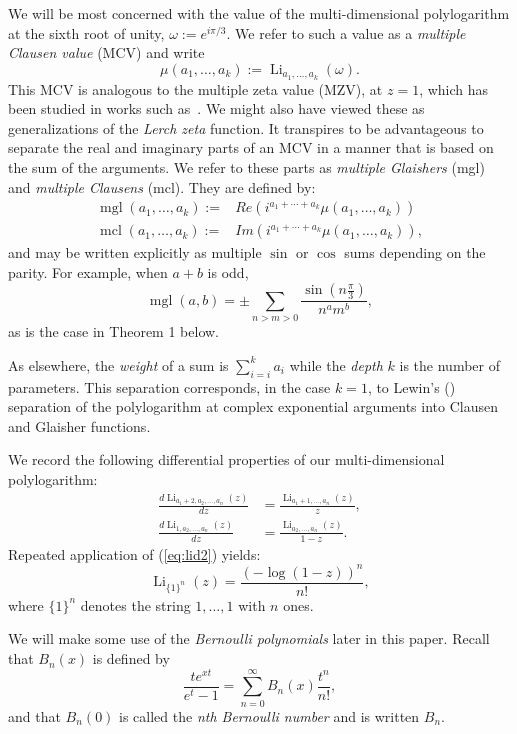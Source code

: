 \documentclass[a4paper,a4paper]{article}
\newcommand{\mcl}{\operatorname{mcl}}
\newcommand{\mgl}{\operatorname{mgl}}
\newcommand{\li}{\operatorname{Li}}
\begin{document}
We will be most concerned with the value of the
multi-dimensional polylogarithm at the sixth root of unity,
 $ \omega := e^{i\pi/3} $.  We refer to such a value as a
  {\em multiple Clausen value}  (MCV)  and write
  $$ \mu(a_1, \dots , a_k)
  := \li_{a_1,  \dots , a_k} (\omega).$$
    This MCV is analogous to the
multiple zeta value (MZV), at $z=1$, which has been studied
 in works such as~\cite{BBB,BBBLC,BBBL}.  We might also have viewed these as
generalizations of the {\em Lerch zeta} function.
  It transpires to be
  advantageous to separate the real and
 imaginary parts of an MCV in a manner
 that is based on the sum of the arguments.
 We refer to these parts as {\em multiple Glaishers}
  (mgl) and {\em multiple Clausens} (mcl).  They are defined by:
\begin{align*}
\mgl(a_1, \dots , a_k) := &Re(i^{a_1 + \cdots + a_k}\mu(a_1, \dots, a_k)) \\
\mcl(a_1, \dots , a_k) := &Im(i^{a_1 + \cdots + a_k}\mu(a_1, \dots,
a_k)),
\end{align*}
and may be written explicitly as multiple $\sin$ or $\cos$ sums
depending on
the parity. For example, when $a+b$ is odd,
$$\mgl(a,b)=\pm \sum_{n>m>0}\frac{\sin(n\frac{\pi}3)}{n^am^b},$$
as is the case in Theorem 1 below.

As elsewhere, the {\em weight} of a sum is  $\sum_{i=i}^k a_i$
while the {\em depth} $k$ is the number of parameters.
This separation corresponds, in the case $k=1$,
to Lewin's (\cite{L}) separation of the polylogarithm
 at complex exponential arguments into Clausen and
  Glaisher functions.

We record the following differential properties of our
multi-dimensional polylogarithm:
\begin{align}
\frac{d\li_{a_1 + 2, a_2, \dots , a_n}(z)}{dz}
&= \frac{\li_{a_1 + 1, \dots , a_n}(z)}{z},\label{eq:lid1}\\
\frac{d\li_{1, a_2, \dots , a_n}(z)}{dz}
&= \frac{\li_{a_2, \dots , a_n}(z)}{1-z}. \label{eq:lid2}
\end{align}
Repeated application of (\ref{eq:lid2}) yields:
\begin{equation}
\label{eq:lid3}
\li_{ \{ 1 \}^n}(z) = \frac{(-\log(1-z))^n}{n!},
\end{equation}
where $ \{ 1 \}^n $ denotes the string $ 1, \dots , 1 $ with $ n $ ones.

We will make  some use of the {\em Bernoulli polynomials} later in this paper.
 Recall that $ B_n(x) $ is defined by
 $$ \frac{te^{xt}}{e^t -1} = \sum_{n=0}^\infty B_n(x) \frac{t^n}{n!},$$
 and  that  $ B_n(0) $ is called the {\em nth Bernoulli number} and is
 written $B_n$.
\end{document}
